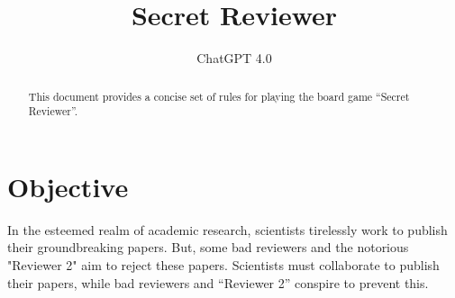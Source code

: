 \documentclass[sigplan,screen,nonacm]{acmart}
\begin{document}
\title{Secret Reviewer}

\author{ChatGPT 4.0}

\begin{abstract}
	This document provides a concise set of rules for playing the board game ``Secret Reviewer''.
\end{abstract}





\maketitle

\section*{Objective}

In the esteemed realm of academic research, scientists tirelessly work to publish their groundbreaking papers. But, some bad reviewers and the notorious "Reviewer 2" aim to reject these papers. Scientists must collaborate to publish their papers, while bad reviewers and ``Reviewer 2'' conspire to prevent this.
\end{document}
